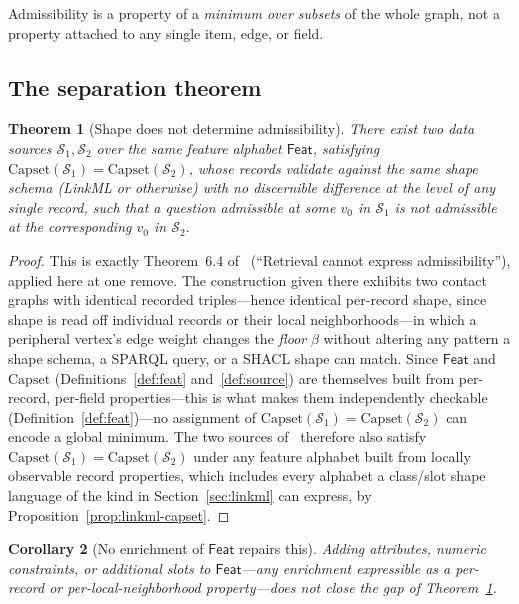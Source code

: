 \documentclass[11pt,a4paper,twocolumn]{article}
\newtheorem{theorem}{Theorem}
\newtheorem{corollary}[theorem]{Corollary}
\theoremstyle{definition}
\theoremstyle{remark}
\newcommand{\Feat}{\mathsf{Feat}}
\newcommand{\Capset}{\mathrm{Capset}}
\newcommand{\Src}{\mathcal{S}}
\begin{document}
Admissibility is a property of a \emph{minimum over subsets} of the whole graph,
not a property attached to any single item, edge, or field.

\subsection{The separation theorem}

\begin{theorem}[Shape does not determine admissibility]
\label{thm:separation}
There exist two data sources $\Src_1,\Src_2$ over the same feature alphabet
$\Feat$, satisfying $\Capset(\Src_1)=\Capset(\Src_2)$, whose records validate
against the same shape schema (LinkML or otherwise) with no discernible
difference at the level of any single record, such that a question admissible
at some $v_0$ in $\Src_1$ is not admissible at the corresponding $v_0$ in
$\Src_2$.
\end{theorem}

\begin{proof}
This is exactly Theorem~6.4 of~\cite{ladder} (``Retrieval cannot express
admissibility''), applied here at one remove. The construction given there
exhibits two contact graphs with identical recorded triples---hence identical
per-record shape, since shape is read off individual records or their local
neighborhoods---in which a peripheral vertex's edge weight changes the
\emph{floor} $\beta$ without altering any pattern a shape schema, a SPARQL query,
or a SHACL shape can match. Since $\Feat$ and $\Capset$ (Definitions~\ref{def:feat}
and~\ref{def:source}) are themselves built from per-record, per-field
properties---this is what makes them independently checkable
(Definition~\ref{def:feat})---no assignment of $\Capset(\Src_1)=\Capset(\Src_2)$
can encode a global minimum. The two sources of~\cite{ladder} therefore also
satisfy $\Capset(\Src_1)=\Capset(\Src_2)$ under any feature alphabet built from
locally observable record properties, which includes every alphabet a class/slot
shape language of the kind in Section~\ref{sec:linkml} can express, by
Proposition~\ref{prop:linkml-capset}.
\end{proof}

\begin{corollary}[No enrichment of $\Feat$ repairs this]
\label{cor:no-enrichment}
Adding attributes, numeric constraints, or additional slots to $\Feat$---any
enrichment expressible as a per-record or per-local-neighborhood property---does
not close the gap of Theorem~\ref{thm:separation}.
\end{corollary}
\end{document}
